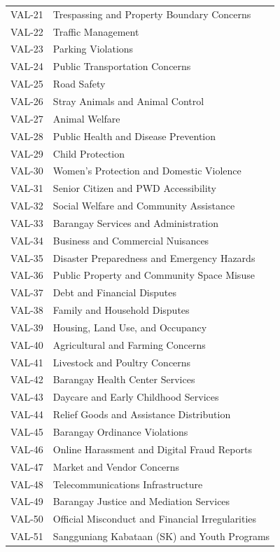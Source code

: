 \begin{longtable}{p{}p{}}
VAL-21 & Trespassing and Property Boundary Concerns\\
VAL-22 & Traffic Management\\
VAL-23 & Parking Violations\\
VAL-24 & Public Transportation Concerns\\
VAL-25 & Road Safety\\
VAL-26 & Stray Animals and Animal Control\\
VAL-27 & Animal Welfare\\
VAL-28 & Public Health and Disease Prevention\\
VAL-29 & Child Protection\\
VAL-30 & Women's Protection and Domestic Violence\\
VAL-31 & Senior Citizen and PWD Accessibility\\
VAL-32 & Social Welfare and Community Assistance\\
VAL-33 & Barangay Services and Administration\\
VAL-34 & Business and Commercial Nuisances\\
VAL-35 & Disaster Preparedness and Emergency Hazards\\
VAL-36 & Public Property and Community Space Misuse\\
VAL-37 & Debt and Financial Disputes\\
VAL-38 & Family and Household Disputes\\
VAL-39 & Housing, Land Use, and Occupancy\\
VAL-40 & Agricultural and Farming Concerns\\
VAL-41 & Livestock and Poultry Concerns\\
VAL-42 & Barangay Health Center Services\\
VAL-43 & Daycare and Early Childhood Services\\
VAL-44 & Relief Goods and Assistance Distribution\\
VAL-45 & Barangay Ordinance Violations\\
VAL-46 & Online Harassment and Digital Fraud Reports\\
VAL-47 & Market and Vendor Concerns\\
VAL-48 & Telecommunications Infrastructure\\
VAL-49 & Barangay Justice and Mediation Services\\
VAL-50 & Official Misconduct and Financial Irregularities\\
VAL-51 & Sangguniang Kabataan (SK) and Youth Programs\\

\end{longtable}
